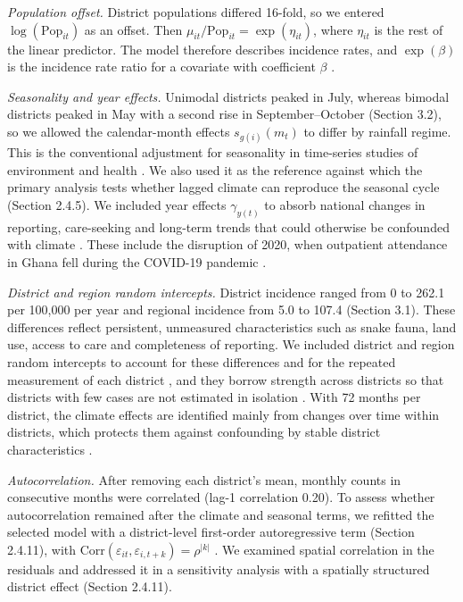 \documentclass[11pt,a4paper]{article}
\begin{document}
\emph{Population offset.} District populations differed 16-fold, so we entered \(\log(\text{Pop}_{it})\) as an offset. Then \(\mu_{it}/\text{Pop}_{it} = \exp(\eta_{it})\), where \(\eta_{it}\) is the rest of the linear predictor. The model therefore describes incidence rates, and \(\exp(\beta)\) is the incidence rate ratio for a covariate with coefficient \(\beta\) \cite{ref26}.

\emph{Seasonality and year effects.} Unimodal districts peaked in July, whereas bimodal districts peaked in May with a second rise in September--October (Section 3.2), so we allowed the calendar-month effects \(s_{g(i)}(m_t)\) to differ by rainfall regime. This is the conventional adjustment for seasonality in time-series studies of environment and health \cite{ref30}. We also used it as the reference against which the primary analysis tests whether lagged climate can reproduce the seasonal cycle (Section 2.4.5). We included year effects \(\gamma_{y(t)}\) to absorb national changes in reporting, care-seeking and long-term trends that could otherwise be confounded with climate \cite{ref30}. These include the disruption of 2020, when outpatient attendance in Ghana fell during the COVID-19 pandemic \cite{ref31}.

\emph{District and region random intercepts.} District incidence ranged from 0 to 262.1 per 100,000 per year and regional incidence from 5.0 to 107.4 (Section 3.1). These differences reflect persistent, unmeasured characteristics such as snake fauna, land use, access to care and completeness of reporting. We included district and region random intercepts to account for these differences and for the repeated measurement of each district \cite{ref32}, and they borrow strength across districts so that districts with few cases are not estimated in isolation \cite{ref33}. With 72 months per district, the climate effects are identified mainly from changes over time within districts, which protects them against confounding by stable district characteristics \cite{ref34}.

\emph{Autocorrelation.} After removing each district's mean, monthly counts in consecutive months were correlated (lag-1 correlation 0.20). To assess whether autocorrelation remained after the climate and seasonal terms, we refitted the selected model with a district-level first-order autoregressive term (Section 2.4.11), with \(\mathrm{Corr}(\varepsilon_{it}, \varepsilon_{i,t+k}) = \rho^{|k|}\) \cite{ref35}. We examined spatial correlation in the residuals and addressed it in a sensitivity analysis with a spatially structured district effect (Section 2.4.11).
\end{document}
